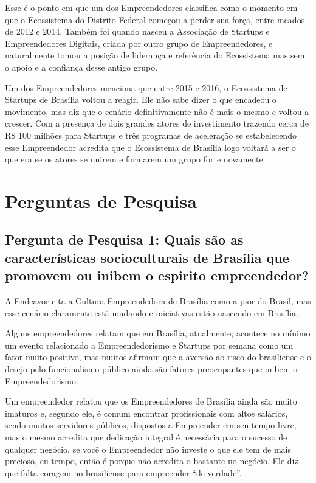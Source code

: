 Esse é o ponto em que um dos Empreendedores classifica como o momento em que o Ecossistema do Distrito Federal começou a perder sua força, entre meados de 2012 e 2014. Também foi quando nasceu a Associação de Startups e Empreendedores Digitais, criada por outro grupo de Empreendedores, e naturalmente tomou a posição de liderança e referência do Ecossistema mas sem o apoio e a confiança desse antigo grupo.

Um dos Empreendedores menciona que entre 2015 e 2016, o Ecossistema de Startups de Brasília voltou a reagir. Ele não sabe dizer o que encadeou o movimento, mas diz que o cenário definitivamente não é mais o mesmo e voltou a crescer. Com a presença de dois grandes atores de investimento trazendo cerca de R\$ 100 milhões para Startups e três programas de aceleração se estabelecendo esse Empreendedor acredita que o Ecossistema de Brasília logo voltará a ser o que era se os atores se unirem e formarem um grupo forte novamente.

\section{Perguntas de Pesquisa}
\label{section:perguntas_de_pesquisa}

\subsection{Pergunta de Pesquisa 1: Quais são as características socioculturais de Brasília que promovem ou inibem o espirito empreendedor?}
\label{subsection:pergunta_de_pesquisa_1}

A Endeavor cita a Cultura Empreendedora de Brasília como a pior do Brasil, mas esse cenário claramente está mudando e iniciativas estão nascendo em Brasília. 

Alguns empreendedores relatam que em Brasília, atualmente, acontece no mínimo um evento relacionado a Empreendedorismo e Startups por semana como um fator muito positivo, mas muitos afirmam que a aversão ao risco do brasiliense e o desejo pelo funcionalismo público ainda são fatores preocupantes que inibem o Empreendedorismo.

Um empreendedor relatou que os Empreendedores de Brasília ainda são muito imaturos e, segundo ele, é comum encontrar profissionais com altos salários, sendo muitos servidores públicos, dispostos a Empreender em seu tempo livre, mas o mesmo acredita que dedicação integral é necessária para o sucesso de qualquer negócio, se você o Empreendedor não investe o que ele tem de mais precioso, eu tempo, então é porque não acredita o bastante no negócio. Ele diz que falta coragem no brasiliense para empreender ``de verdade''.

